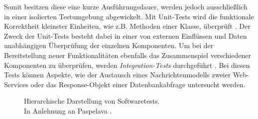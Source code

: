 Somit besitzen diese eine kurze Ausführungsdauer, werden jedoch ausschließlich in einer isolierten Testumgebung abgewickelt. Mit Unit-Tests wird die funktionale Korrektheit kleinster Einheiten, wie z.B. Methoden einer Klasse, über\-prüft \cite[177]{Jamil.1122201611242016}. Der Zweck der Unit-Tests besteht dabei in einer von externen Einflüssen und Daten unabhängigen Überprüfung der einzelnen Komponenten.
Um bei der Bereitstellung neuer Funktionalitäten ebenfalls das Zusammenspiel verschiedener Komponenten zu überprüfen, werden \textit{Integration-Tests} durchgeführt \cite[177]{Jamil.1122201611242016}. Bei diesen Tests können Aspekte, wie der Austausch eines Nachrichtenmodells zweier Web-Services oder das Response-Objekt einer Datenbankabfrage untersucht werden. 
\begin{center}
	\begin{figure}[H]
		\centering
		\caption[Hierarchische Darstellung von Softwaretests]{Hierarchische Darstellung von Softwaretests.\\ \hspace{0.5cm}In Anlehnung an Paspelava \cite{Exposit.2021}.}
		\label{fig:Tests}
	\end{figure}
\end{center}
\vspace*{-15mm}
